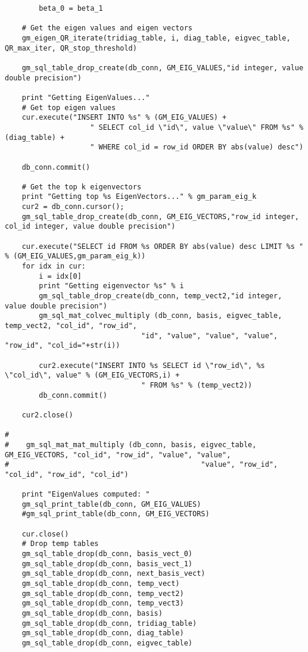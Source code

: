 \documentclass[11pt]{article}
\begin{document}
\begin{lstlisting}
        beta_0 = beta_1
        
    # Get the eigen values and eigen vectors
    gm_eigen_QR_iterate(tridiag_table, i, diag_table, eigvec_table, QR_max_iter, QR_stop_threshold)
    
    gm_sql_table_drop_create(db_conn, GM_EIG_VALUES,"id integer, value double precision")
    
    print "Getting EigenValues..."
    # Get top eigen values
    cur.execute("INSERT INTO %s" % (GM_EIG_VALUES) +
                    " SELECT col_id \"id\", value \"value\" FROM %s" % (diag_table) +
                    " WHERE col_id = row_id ORDER BY abs(value) desc")
                    
    db_conn.commit()
    
    # Get the top k eigenvectors
    print "Getting top %s EigenVectors..." % gm_param_eig_k
    cur2 = db_conn.cursor();
    gm_sql_table_drop_create(db_conn, GM_EIG_VECTORS,"row_id integer, col_id integer, value double precision")
    
    cur.execute("SELECT id FROM %s ORDER BY abs(value) desc LIMIT %s " % (GM_EIG_VALUES,gm_param_eig_k))
    for idx in cur:
        i = idx[0]
        print "Getting eigenvector %s" % i
        gm_sql_table_drop_create(db_conn, temp_vect2,"id integer, value double precision")
        gm_sql_mat_colvec_multiply (db_conn, basis, eigvec_table, temp_vect2, "col_id", "row_id", 
                                "id", "value", "value", "value", "row_id", "col_id="+str(i))
                                
        cur2.execute("INSERT INTO %s SELECT id \"row_id\", %s \"col_id\", value" % (GM_EIG_VECTORS,i) +
                                " FROM %s" % (temp_vect2))
        db_conn.commit()
        
    cur2.close()    

#    
#    gm_sql_mat_mat_multiply (db_conn, basis, eigvec_table, GM_EIG_VECTORS, "col_id", "row_id", "value", "value", 
#                                             "value", "row_id", "col_id", "row_id", "col_id")
        
    print "EigenValues computed: "
    gm_sql_print_table(db_conn, GM_EIG_VALUES)
    #gm_sql_print_table(db_conn, GM_EIG_VECTORS)       
    
    cur.close()        
    # Drop temp tables
    gm_sql_table_drop(db_conn, basis_vect_0)
    gm_sql_table_drop(db_conn, basis_vect_1)
    gm_sql_table_drop(db_conn, next_basis_vect)
    gm_sql_table_drop(db_conn, temp_vect)
    gm_sql_table_drop(db_conn, temp_vect2)
    gm_sql_table_drop(db_conn, temp_vect3)
    gm_sql_table_drop(db_conn, basis)
    gm_sql_table_drop(db_conn, tridiag_table)
    gm_sql_table_drop(db_conn, diag_table)
    gm_sql_table_drop(db_conn, eigvec_table)
  


\end{lstlisting}
\end{document}
